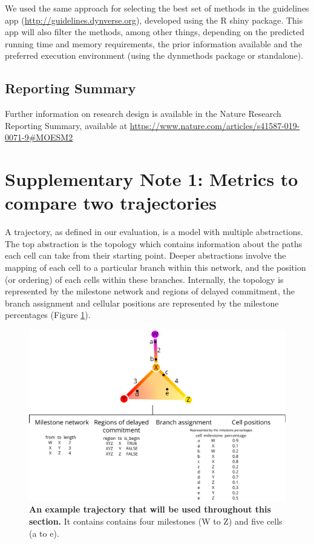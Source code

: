 We used the same approach for selecting the best set of methods in the guidelines app (\href{http://guidelines.dynverse.org}{http://guidelines.dynverse.org}), developed using the R shiny package. This app will also filter the methods, among other things, depending on the predicted running time and memory requirements, the prior information available and the preferred execution environment (using the dynmethods package or standalone).

\subsection{Reporting Summary}

Further information on research design is available in the Nature Research Reporting Summary, available at \href{https://www.nature.com/articles/s41587-019-0071-9\#MOESM2}{https://www.nature.com/articles/s41587-019-0071-9\#MOESM2}

\section{Supplementary Note 1: Metrics to compare two trajectories}

A trajectory, as defined in our evaluation, is a model with multiple abstractions. The top abstraction is the topology which contains information about the paths each cell can take from their starting point. Deeper abstractions involve the mapping of each cell to a particular branch within this network, and the position (or ordering) of each cells within these branches. Internally, the topology is represented by the milestone network and regions of delayed commitment, the branch assignment and cellular positions are represented by the milestone percentages (Figure \ref{fig:snote1fig_1}).

\begin{figure}[htb!]
	\centering\includegraphics[width=\linewidth]{fig/snote1fig_1.pdf}
	\caption{
		\textbf{An example trajectory that will be used throughout this section.}
		It contains contains four milestones (W to Z) and five cells (a to e).
	}
	\label{fig:snote1fig_1}
\end{figure}

